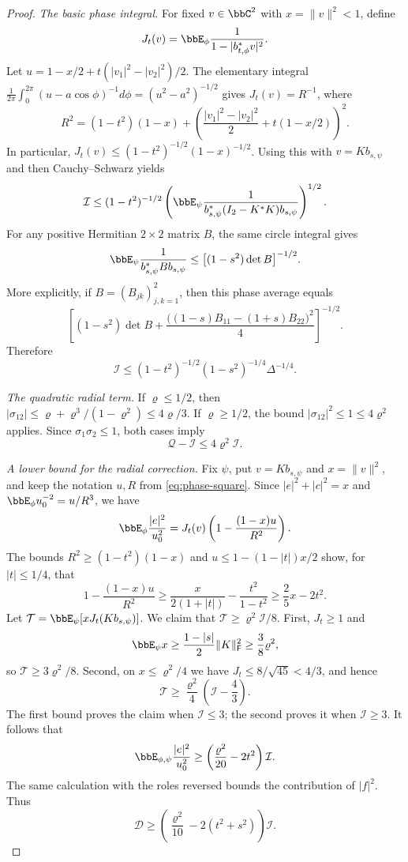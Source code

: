 \documentclass[11pt,reqno]{amsart}
\begin{document}
\begin{proof}
\smallskip
\emph{The basic phase integral.}
For fixed $v\in\bbC^2$ with $x=\|v\|^2<1$, define
\[
 J_t(v)=\bbE_\phi\frac1{1-|b_{t,\phi}^*v|^2}.
\]
Let $u=1-x/2+t(|v_1|^2-|v_2|^2)/2$. The elementary integral
$\frac1{2\pi}\int_0^{2\pi}(u-a\cos\phi)^{-1}d\phi=(u^2-a^2)^{-1/2}$ gives $J_t(v)=R^{-1}$, where
\begin{equation}\label{eq:phase-square}
 R^2=(1-t^2)(1-x)+
 \left(\frac{|v_1|^2-|v_2|^2}{2}+t(1-x/2)\right)^2.
\end{equation}
In particular, $J_t(v)\le(1-t^2)^{-1/2}(1-x)^{-1/2}$. Using this with $v=Kb_{s,\psi}$ and then Cauchy--Schwarz yields
\[
 \mathcal I\le(1-t^2)^{-1/2}
 \left(\bbE_\psi\frac1{b_{s,\psi}^*(I_2-K^*K)b_{s,\psi}}\right)^{1/2}.
\]
For any positive Hermitian $2\times2$ matrix $B$, the same circle integral gives
\[
 \bbE_\psi\frac1{b_{s,\psi}^*Bb_{s,\psi}}
 \le\bigl[(1-s^2)\det B\bigr]^{-1/2}.
\]
More explicitly, if $B=(B_{jk})_{j,k=1}^2$, then this phase average equals
\[
 \left[(1-s^2)\det B+
 \frac{\bigl((1-s)B_{11}-(1+s)B_{22}\bigr)^2}{4}\right]^{-1/2}.
\]
Therefore
\begin{equation}\label{eq:I-bound}
 \mathcal I\le(1-t^2)^{-1/2}(1-s^2)^{-1/4}\Delta^{-1/4}.
\end{equation}

\smallskip
\emph{The quadratic radial term.}
If $\varrho\le1/2$, then
$|\sigma_{12}|\le\varrho+\varrho^3/(1-\varrho^2)\le4\varrho/3$.
If $\varrho\ge1/2$, the bound $|\sigma_{12}|^2\le1\le4\varrho^2$ applies. Since $\sigma_1\sigma_2\le1$, both cases imply
\begin{equation}\label{eq:Q-bound}
 \mathcal Q-\mathcal I\le4\varrho^2\mathcal I.
\end{equation}

\smallskip
\emph{A lower bound for the radial correction.}
Fix $\psi$, put $v=Kb_{s,\psi}$ and $x=\|v\|^2$, and keep the notation $u,R$ from \eqref{eq:phase-square}. Since $|e|^2+|c|^2=x$ and $\bbE_\phi u_0^{-2}=u/R^3$, we have
\[
 \bbE_\phi\frac{|e|^2}{u_0^2}
 =J_t(v)\left(1-\frac{(1-x)u}{R^2}\right).
\]
The bounds $R^2\ge(1-t^2)(1-x)$ and $u\le1-(1-|t|)x/2$ show, for $|t|\le1/4$, that
\[
 1-\frac{(1-x)u}{R^2}
 \ge \frac{x}{2(1+|t|)}-\frac{t^2}{1-t^2}
 \ge \frac25x-2t^2.
\]
Let $\mathcal T=\bbE_\psi[xJ_t(Kb_{s,\psi})]$. We claim that $\mathcal T\ge\varrho^2\mathcal I/8$. First, $J_t\ge1$ and
\[
 \bbE_\psi x\ge\frac{1-|s|}{2}\|K\|_{\mathsf{F}}^2\ge\frac38\varrho^2,
\]
so $\mathcal T\ge3\varrho^2/8$. Second, on $x\le\varrho^2/4$ we have $J_t\le8/\sqrt{45}<4/3$, and hence
\[
 \mathcal T\ge\frac{\varrho^2}{4}\left(\mathcal I-\frac43\right).
\]
The first bound proves the claim when $\mathcal I\le3$; the second proves it when $\mathcal I\ge3$. It follows that
\[
 \bbE_{\phi,\psi}\frac{|e|^2}{u_0^2}
 \ge\left(\frac{\varrho^2}{20}-2t^2\right)\mathcal I.
\]
The same calculation with the roles reversed bounds the contribution of $|f|^2$. Thus
\begin{equation}\label{eq:D-bound}
 \mathcal D\ge\left(\frac{\varrho^2}{10}-2(t^2+s^2)\right)\mathcal I.
\end{equation}


\end{proof}
\end{document}

